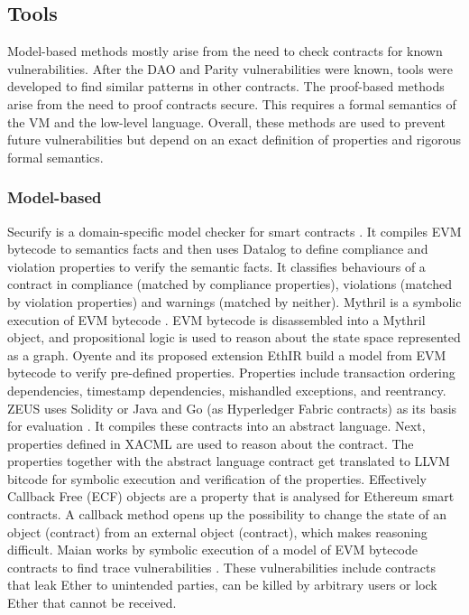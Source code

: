 


\subsection{Tools}
Model-based methods mostly arise from the need to check contracts for known vulnerabilities. After the DAO and Parity vulnerabilities were known, tools were developed to find similar patterns in other contracts. The proof-based methods arise from the need to proof contracts secure. This requires a formal semantics of the VM and the low-level language. Overall, these methods are used to prevent future vulnerabilities but depend on an exact definition of properties and rigorous formal semantics.

\subsubsection{Model-based}
Securify is a domain-specific model checker for smart contracts \cite{Tsankov2017}. It compiles EVM bytecode to semantics facts and then uses Datalog to define compliance and violation properties to verify the semantic facts. It classifies behaviours of a contract in compliance (matched by compliance properties), violations (matched by violation properties) and warnings (matched by neither). 
Mythril is a symbolic execution of EVM bytecode \cite{Mueller2018}. EVM bytecode is disassembled into a Mythril object, and propositional logic is used to reason about the state space represented as a graph. 
Oyente \cite{Luu2016} and its proposed extension EthIR \cite{Albert2018} build a model from EVM bytecode to verify pre-defined properties. Properties include transaction ordering dependencies, timestamp dependencies, mishandled exceptions, and reentrancy.
ZEUS uses Solidity or Java and Go (as Hyperledger Fabric contracts) as its basis for evaluation \cite{Kalra2018}. It compiles these contracts into an abstract language. Next, properties defined in XACML are used to reason about the contract. The properties together with the abstract language contract get translated to LLVM bitcode for symbolic execution and verification of the properties.
Effectively Callback Free (ECF) objects are a property that is analysed for Ethereum smart contracts\cite{Grossman2017}. A callback method opens up the possibility to change the state of an object (contract) from an external object (contract), which makes reasoning difficult. 
Maian works by symbolic execution of a model of EVM bytecode contracts to find trace vulnerabilities \cite{Nikolic2018}. These vulnerabilities include contracts that leak Ether to unintended parties, can be killed by arbitrary users or lock Ether that cannot be received. 

